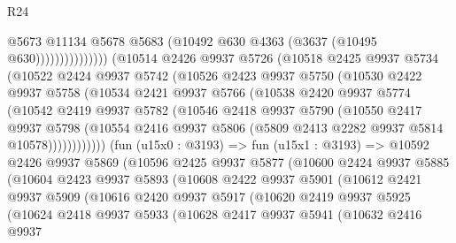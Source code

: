 \begin{lexlean}{R24}
\begin{coremodule}
                                @5673
                                @11134
                                @5678
                                @5683
                                (@10492 @630 @4363 (@3637 (@10495 @630)))))))))))))))
        (@10514
          @2426
          @9937
          @5726
          (@10518
            @2425
            @9937
            @5734
            (@10522
              @2424
              @9937
              @5742
              (@10526
                @2423
                @9937
                @5750
                (@10530
                  @2422
                  @9937
                  @5758
                  (@10534
                    @2421
                    @9937
                    @5766
                    (@10538
                      @2420
                      @9937
                      @5774
                      (@10542
                        @2419
                        @9937
                        @5782
                        (@10546
                          @2418
                          @9937
                          @5790
                          (@10550
                            @2417
                            @9937
                            @5798
                            (@10554
                              @2416
                              @9937
                              @5806
                              (@5809 @2413 @2282 @9937 @5814 @10578))))))))))))
        (fun (u15x0 : @3193) =>
        fun (u15x1 : @3193) =>
        @10592
          @2426
          @9937
          @5869
          (@10596
            @2425
            @9937
            @5877
            (@10600
              @2424
              @9937
              @5885
              (@10604
                @2423
                @9937
                @5893
                (@10608
                  @2422
                  @9937
                  @5901
                  (@10612
                    @2421
                    @9937
                    @5909
                    (@10616
                      @2420
                      @9937
                      @5917
                      (@10620
                        @2419
                        @9937
                        @5925
                        (@10624
                          @2418
                          @9937
                          @5933
                          (@10628
                            @2417
                            @9937
                            @5941
                            (@10632
                              @2416
                              @9937

\end{coremodule}
\end{lexlean}
